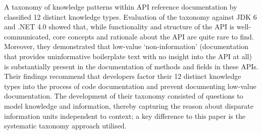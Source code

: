 A taxonomy of knowledge patterns within API reference documentation by \citet{Maalej:2013uu} classified 12 distinct knowledge types. Evaluation of the taxonomy against JDK 6 and .NET 4.0 showed that, while functionality and structure of the API is well-communicated, core concepts and rationale about the API are quite rare to find. Moreover, they demonstrated that low-value `non-information' (documentation that provides uninformative boilerplate text with no insight into the API at all) is substantially present in the documentation of methods and fields in these APIs. Their findings recommend that developers factor their 12 distinct knowledge types into the process of code documentation and prevent documenting low-value documentation. The development of their taxonomy consisted of questions to model knowledge and information, thereby capturing the reason about disparate information units independent to context; a key difference to this paper is the systematic taxonomy approach utilised.



%



